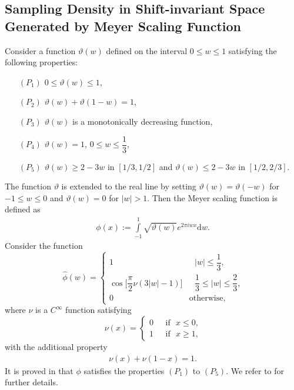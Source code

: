 \documentclass[a4paper,12pt,reqno]{amsart}
\theoremstyle{plain}
\numberwithin{equation}{section}
\theoremstyle{definition}
\begin{document}
\subsection{Sampling Density in Shift-invariant Space Generated by Meyer Scaling Function}
Consider a function $\vartheta(w)$ defined on the interval
$0\leq w \leq 1$ satisfying the following properties:
\begin{itemize}
\item[$(P_1)$] $0\leq\vartheta(w)\leq 1$,
\item[$(P_2)$] $\vartheta(w)+\vartheta(1-w)=1$,
\item[$(P_3)$] $\vartheta(w)$ is a monotonically decreasing function,
\item[$(P_4)$] $\vartheta(w)=1$, $0\leq w \leq \dfrac{1}{3}$,
\item[$(P_5)$] $\vartheta(w)\geq 2-3w$ in $[1/3,1/2]$ and $\vartheta(w)\leq 2-3w$ in $[1/2,2/3]$.
\end{itemize}
The function $\vartheta$ is extended to the real line by setting
$\vartheta(w)=\vartheta(-w)$ for $-1\leq w\leq 0$ and
$\vartheta(w)=0$ for $|w| > 1$. Then the Meyer scaling function
is defined as
\begin{eqnarray*}
\phi(x):=\displaystyle\int\limits_{-1}^{1}\sqrt{\vartheta(w)}e^{2\pi iw x}\mathrm{d}w.
\end{eqnarray*}
 Consider the function
\begin{equation*}
 \widehat{\phi}(w)= \left\{\begin{array}{cc}
1& \mbox{ $|w|\leq \dfrac{1}{3}$,}\\
\cos\Big[\dfrac{\pi}{2}\nu(3|w|-1)\Big] &\mbox{ $\dfrac{1}{3}\leq|w|\leq \dfrac{2}{3}$,}\\
0 &\mbox{otherwise,}
\end{array} \right.
\end{equation*}
where $\nu$ is a  $C^\infty$ function satisfying
\begin{equation*}
 \nu(x)= \left\{\begin{array}{cc}
0& \mbox{~~if~ $x\leq0$,}\\
1 &\mbox{~~if~ $x\geq1$,}
\end{array} \right.
\end{equation*}
with the additional property
\begin{eqnarray*}
\nu(x)+\nu(1-x)=1.
\end{eqnarray*}
It is proved in \cite{AntoRad3} that $\phi$ satisfies the properties $(P_1)$ to $(P_5)$. 
We refer to \cite{AntoRad3} for further details.
\end{document}
